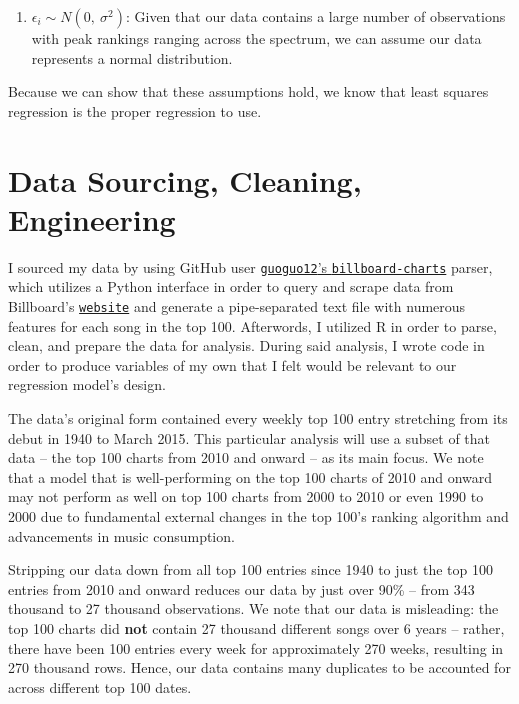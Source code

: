 \documentclass[11pt]{article} %
\begin{document}
\begin{enumerate}
	\item $\epsilon_i \sim N(0,\ \sigma^2)$: Given that our data contains a large number of observations with peak rankings ranging across the spectrum, we can assume our data represents a normal distribution.
\end{enumerate}

Because we can show that these assumptions hold, we know that least squares regression is the proper regression to use. \par

\section*{Data Sourcing, Cleaning, Engineering}
I sourced my data by using GitHub user \href{https://github.com/guoguo12/billboard-charts}{\texttt{guoguo12}'s \texttt{billboard-charts}} parser, which utilizes a Python interface in order to query   and scrape data from Billboard's \href{http://www.billboard.com/charts/hot-100}{\texttt{website}} and generate a pipe-separated text file with numerous features for each song in the top 100. Afterwords, I utilized \textsc{R} in order to parse, clean, and prepare the data for analysis. During said analysis, I wrote code in order to produce variables of my own that I felt would be relevant to our regression model's design. \par

The data's original form contained every weekly top 100 entry stretching from its debut in 1940 to March 2015. This particular analysis will use a subset of that data -- the top 100 charts from 2010 and onward -- as its main focus. We note that a model that is well-performing on the top 100 charts of 2010 and onward may not perform as well on top 100 charts from 2000 to 2010 or even 1990 to 2000 due to fundamental external changes in the top 100's ranking algorithm and advancements in music consumption. \par

Stripping our data down from all top 100 entries since 1940 to just the top 100 entries from 2010 and onward reduces our data by just over 90\% -- from 343 thousand to 27 thousand observations. We note that our data is misleading: the top 100 charts did \textbf{not} contain 27 thousand different songs over 6 years -- rather, there have been 100 entries every week for approximately 270 weeks, resulting in 270 thousand rows. Hence, our data contains many duplicates to be accounted for across different top 100 dates. \par
\end{document}
